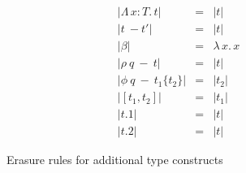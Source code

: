 \documentclass[acmsmall]{acmart}\settopmatter{}
\newcommand{\labfig}[1]{\label{fig:#1}}
\newcommand{\abs}[4]{{#1}\, #2\! : \! #3.\, #4}
\newcommand{\lam}[2]{\lambda\, #1.\, #2}
\begin{document}
\begin{figure}
\centering
\[
  \begin{array}{lll}
    |\abs{\Lambda}{x}{T}{t}| & = & |t| \\
    |t\ -t'| & = & |t| \\
    |\beta| & = & \lam{x}{x} \\
    |\rho\ q\ - \ t| & = & |t| \\
    |\phi\ q\ - \ t_1 \{t_2\}| & = & |t_2| \\
    |[t_1,t_2]| & = & |t_1| \\
    |t.1| & = & |t| \\
    |t.2| & = & |t| 
  \end{array}
  \]
\caption{Erasure rules for additional type constructs} 
\labfig{erase}
\end{figure}
\end{document}
